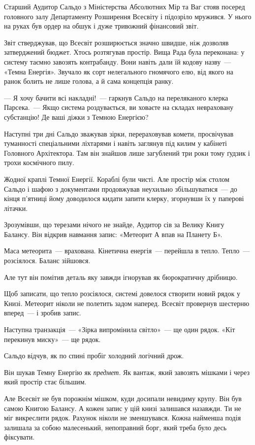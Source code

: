 \documentclass[12pt, a4paper, openany]{book}
\begin{document}
\begin{terrybox}
Старший Аудитор Сальдо з Міністерства Абсолютних Мір та Ваг стояв посеред головного залу Департаменту Розширення Всесвіту і підозріло мружився. У нього на руках був ордер на обшук і дуже тривожний фінансовий звіт.

Звіт стверджував, що Всесвіт розширюється значно швидше, ніж дозволяв затверджений бюджет. Хтось розтягував простір. Вища Рада була переконана: у систему таємно завозять контрабанду. Вони навіть дали їй кодову назву~--- «Темна Енергія». Звучало як сорт нелегального гномячого елю, від якого на ранок болить не лише голова, а й сама концепція ранку.

--- Я хочу бачити всі накладні!~--- гаркнув Сальдо на переляканого клерка Парсека.~--- Якщо система роздувається, ви ховаєте на складах невраховану субстанцію! Де ваші діжки з Темною Енергією?

Наступні три дні Сальдо зважував зірки, перераховував комети, просвічував туманності спеціальними ліхтарями і навіть заглянув під килим у кабінеті Головного Архітектора. Там він знайшов лише загублений три роки тому ґудзик і трохи космічного пилу.

Жодної краплі Темної Енергії. Кораблі були чисті. Але простір між столом Сальдо і шафою з документами продовжував неухильно збільшуватися~--- до кінця п'ятниці йому доводилося кидати запити клерку, згорнувши їх у паперові літачки.

\medskip
Зрозумівши, що терезами нічого не знайде, Аудитор сів за Велику Книгу Балансу. Він відкрив навмання запис: «Метеорит А впав на Планету Б».

Маса метеорита~--- врахована. Кінетична енергія~--- перейшла в тепло. Тепло~--- розсіялося. Баланс зійшовся.

Але тут він помітив деталь яку завжди ігнорував як бюрократичну дрібницю.

Щоб записати, що тепло розсіялося, системі довелося створити новий рядок у Книзі. Метеорит ніколи не полетить задом наперед. Всесвіт провернув шестерню вперед~--- і зробив запис.

Наступна транзакція~--- «Зірка випромінила світло»~--- ще один рядок. «Кіт перекинув миску»~--- ще рядок.

Сальдо відчув, як по спині пробіг холодний логічний дрож.

Він шукав Темну Енергію як \textit{предмет}. Як вантаж, який завозять мішками і через який простір стає більшим.

Але Всесвіт не був порожнім мішком, куди досипали невидиму крупу. Він був самою Книгою Балансу. А кожен запис у цій книзі залишався назавжди. Ти не міг викреслити рядок. Рахунок ніколи не зменшувався. Кожна найменша подія залишала за собою малесенький, непоправний борг, який треба було десь фіксувати.


\end{terrybox}
\end{document}

